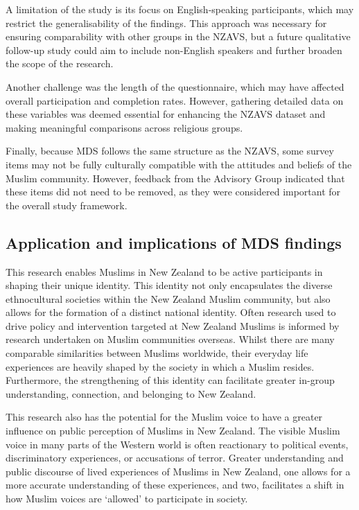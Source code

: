 \documentclass[
]{interact}
\begin{document}
A limitation of the study is its focus on English-speaking participants,
which may restrict the generalisability of the findings. This approach
was necessary for ensuring comparability with other groups in the NZAVS,
but a future qualitative follow-up study could aim to include
non-English speakers and further broaden the scope of the research.

Another challenge was the length of the questionnaire, which may have
affected overall participation and completion rates. However, gathering
detailed data on these variables was deemed essential for enhancing the
NZAVS dataset and making meaningful comparisons across religious groups.

Finally, because MDS follows the same structure as the NZAVS, some
survey items may not be fully culturally compatible with the attitudes
and beliefs of the Muslim community. However, feedback from the Advisory
Group indicated that these items did not need to be removed, as they
were considered important for the overall study framework.

\subsection{Application and implications of MDS
findings}\label{application-and-implications-of-mds-findings}

This research enables Muslims in New Zealand to be active participants
in shaping their unique identity. This identity not only encapsulates
the diverse ethnocultural societies within the New Zealand Muslim
community, but also allows for the formation of a distinct national
identity. Often research used to drive policy and intervention targeted
at New Zealand Muslims is informed by research undertaken on Muslim
communities overseas. Whilst there are many comparable similarities
between Muslims worldwide, their everyday life experiences are heavily
shaped by the society in which a Muslim resides. Furthermore, the
strengthening of this identity can facilitate greater in-group
understanding, connection, and belonging to New Zealand.

This research also has the potential for the Muslim voice to have a
greater influence on public perception of Muslims in New Zealand. The
visible Muslim voice in many parts of the Western world is often
reactionary to political events, discriminatory experiences, or
accusations of terror. Greater understanding and public discourse of
lived experiences of Muslims in New Zealand, one allows for a more
accurate understanding of these experiences, and two, facilitates a
shift in how Muslim voices are `allowed' to participate in society.
\end{document}
